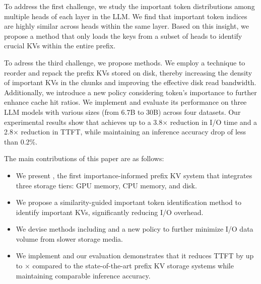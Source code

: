 To address the first challenge, we study the important token distributions among multiple
heads of each layer in the LLM. We find that important token
indices are highly similar across heads within the same layer.
Based on this insight, we propose a \techa{} method that only loads the keys from a subset of heads
to identify crucial KVs within the entire prefix. 


To adress the third challenge, we propose \techb{} methods. 
We employ a \techba{} technique to reorder and repack the prefix KVs stored on
disk, thereby increasing the density of important KVs in the chunks and
improving the effective disk read bandwidth. Additionally, we introduce a new
\techbb{} policy considering token's importance to further enhance cache hit
ratios.
We implement \pname{} and evaluate its performance on three LLM models with various sizes (from 6.7B to 30B) across four datasets. Our experimental results show that \pname{} achieves up to a 3.8$\times$ reduction in I/O time and a 2.8$\times$ reduction in TTFT, while maintaining an inference accuracy drop of less than 0.2\%.

The main contributions of this paper are as follows:
\begin{itemize}
\item We present \pname{}, the first importance-informed prefix KV 
system that integrates three storage tiers: GPU memory, CPU memory, and disk. 

\item We propose a similarity-guided important token identification method to
identify important KVs, significantly reducing I/O overhead.

\item We devise \techb{} methods including \techba{} and a new \techbb{} policy to further minimize I/O data volume from slower storage media.

\item We implement \pname{} and our evaluation demonstrates that it reduces TTFT by up to $\times$ compared to the state-of-the-art prefix KV storage systems while maintaining comparable inference accuracy.
\end{itemize}
